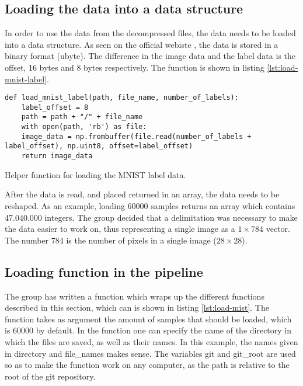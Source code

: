 \subsection{Loading the data into a data structure}\label{subsec:load-data}
In order to use the data from the decompressed files, the data needs to be loaded into a data structure. As seen on the official webiste \cite{MNIST}, the data is stored in a binary format (ubyte). The difference in the image data and the label data is the offset, 16 bytes and 8 bytes respectively. The function is shown in listing \ref{lst:load-mnist-label}.

\begin{listing}[!ht]
\begin{verbatim}
def load_mnist_label(path, file_name, number_of_labels):
    label_offset = 8
    path = path + "/" + file_name
    with open(path, 'rb') as file:
    image_data = np.frombuffer(file.read(number_of_labels + label_offset), np.uint8, offset=label_offset)
    return image_data
\end{verbatim}
\caption{Helper function for loading the MNIST label data.}
\label{lst:load-mnist-label}
\end{listing}

After the data is read, and placed returned in an array, the data needs to be reshaped. As an example, loading 60000 samples returns an array which contains 47.040.000 integers. The group decided that a delimitation was necessary to make the data easier to work on, thus representing a single image as a $1 \times 784$ vector. The number 784 is the number of pixels in a single image ($28 \times 28$).


\subsection{Loading function in the pipeline}
The group has written a function which wraps up the different functions described in this section, which can is shown in listing \ref{lst:load-mist}. The function takes as argument the amount of samples that should be loaded, which is 60000 by default. In the function one can specify the name of the directory in which the files are saved, as well as their names. In this example, the names given in directory and file\_names makes sense. The variables git and git\_root are used so as to make the function work on any computer, as the path is relative to the root of the git repository.

